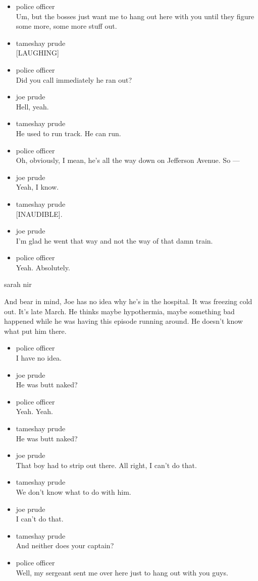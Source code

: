 \begin{itemize}
\item
  police officer\\
  Um, but the bosses just want me to hang out here with you until they
  figure some more, some more stuff out.
\item
  tameshay prude\\
  {[}LAUGHING{]}
\item
  police officer\\
  Did you call immediately he ran out?
\item
  joe prude\\
  Hell, yeah.
\item
  tameshay prude\\
  He used to run track. He can run.
\item
  police officer\\
  Oh, obviously, I mean, he's all the way down on Jefferson Avenue. So
  ---
\item
  joe prude\\
  Yeah, I know.
\item
  tameshay prude\\
  {[}INAUDIBLE{]}.
\item
  joe prude\\
  I'm glad he went that way and not the way of that damn train.
\item
  police officer\\
  Yeah. Absolutely.
\end{itemize}

sarah nir

And bear in mind, Joe has no idea why he's in the hospital. It was
freezing cold out. It's late March. He thinks maybe hypothermia, maybe
something bad happened while he was having this episode running around.
He doesn't know what put him there.

\begin{itemize}
\item
  police officer\\
  I have no idea.
\item
  joe prude\\
  He was butt naked?
\item
  police officer\\
  Yeah. Yeah.
\item
  tameshay prude\\
  He was butt naked?
\item
  joe prude\\
  That boy had to strip out there. All right, I can't do that.
\item
  tameshay prude\\
  We don't know what to do with him.
\item
  joe prude\\
  I can't do that.
\item
  tameshay prude\\
  And neither does your captain?
\item
  police officer\\
  Well, my sergeant sent me over here just to hang out with you guys.
\end{itemize}

